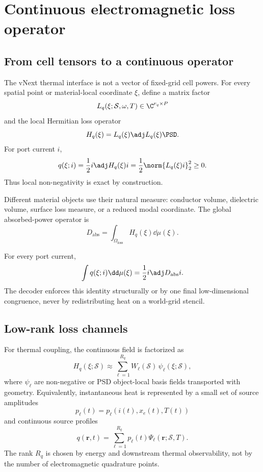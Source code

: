 \section{Continuous electromagnetic loss operator}

\subsection{From cell tensors to a continuous operator}

The vNext thermal interface is not a vector of fixed-grid cell powers. For
every spatial point or material-local coordinate $\xi$, define a matrix factor
\[
  L_q(\xi;\mathcal S,\omega,T)\in\C^{r_q\times P}
\]
and the local Hermitian loss operator
\[
  H_q(\xi)=L_q(\xi)\adj L_q(\xi)\PSD.
\]
For port current $i$,
\[
  q(\xi;i)
  =\frac{1}{2}i\adj H_q(\xi)i
  =\frac{1}{2}\norm{L_q(\xi)i}_2^2
  \ge 0.
\]
Thus local non-negativity is exact by construction.

Different material objects use their natural measure: conductor volume,
dielectric volume, surface loss measure, or a reduced modal coordinate.
The global absorbed-power operator is
\[
  D_{\mathrm{abs}}
  =\int_{\Omega_{\mathrm{loss}}}
    H_q(\xi)\dd\mu(\xi).
\]

\begin{invariant}
For every port current,
\[
  \int q(\xi;i)\dd\mu(\xi)
  =\frac{1}{2}i\adj D_{\mathrm{abs}}i .
\]
The decoder enforces this identity structurally or by one final low-dimensional
congruence, never by redistributing heat on a world-grid stencil.
\end{invariant}

\subsection{Low-rank loss channels}

For thermal coupling, the continuous field is factorized as
\[
  H_q(\xi;\mathcal S)
  \approx
  \sum_{\ell=1}^{R_q}
  W_\ell(\mathcal S)\,
  \psi_\ell(\xi;\mathcal S),
\]
where $\psi_\ell$ are non-negative or PSD object-local basis fields transported
with geometry. Equivalently, instantaneous heat is represented by a small set
of source amplitudes
\[
  p_\ell(t)=p_\ell(i(t),x_e(t),T(t))
\]
and continuous source profiles
\[
  q(\mathbf r,t)
  =\sum_{\ell=1}^{R_q}p_\ell(t)\Psi_\ell(\mathbf r;\mathcal S,T).
\]
The rank $R_q$ is chosen by energy and downstream thermal observability, not by
the number of electromagnetic quadrature points.

